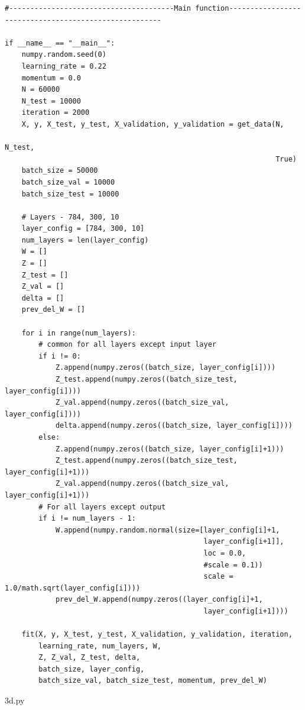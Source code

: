 \documentclass{article}
\begin{document}
\begin{lstlisting}
#---------------------------------------Main function------------------------------------------------------
        
if __name__ == "__main__":     
    numpy.random.seed(0)
    learning_rate = 0.22
    momentum = 0.0
    N = 60000
    N_test = 10000
    iteration = 2000
    X, y, X_test, y_test, X_validation, y_validation = get_data(N, 
                                                                N_test, 
                                                                True)
    batch_size = 50000
    batch_size_val = 10000
    batch_size_test = 10000
    
    # Layers - 784, 300, 10
    layer_config = [784, 300, 10]
    num_layers = len(layer_config)
    W = []
    Z = []
    Z_test = []
    Z_val = []
    delta = []
    prev_del_W = []
        
    for i in range(num_layers): 
        # common for all layers except input layer
        if i != 0:
            Z.append(numpy.zeros((batch_size, layer_config[i])))
            Z_test.append(numpy.zeros((batch_size_test, layer_config[i])))
            Z_val.append(numpy.zeros((batch_size_val, layer_config[i])))
            delta.append(numpy.zeros((batch_size, layer_config[i])))
        else:
            Z.append(numpy.zeros((batch_size, layer_config[i]+1)))
            Z_test.append(numpy.zeros((batch_size_test, layer_config[i]+1)))
            Z_val.append(numpy.zeros((batch_size_val, layer_config[i]+1)))
        # For all layers except output
        if i != num_layers - 1:
            W.append(numpy.random.normal(size=[layer_config[i]+1, 
                                               layer_config[i+1]], 
                                               loc = 0.0, 
                                               #scale = 0.1))
                                               scale = 1.0/math.sqrt(layer_config[i])))
            prev_del_W.append(numpy.zeros((layer_config[i]+1, 
                                               layer_config[i+1])))
                                               
    fit(X, y, X_test, y_test, X_validation, y_validation, iteration, 
        learning_rate, num_layers, W, 
        Z, Z_val, Z_test, delta,  
        batch_size, layer_config,
        batch_size_val, batch_size_test, momentum, prev_del_W)
\end{lstlisting}
3d.py
\end{document}
